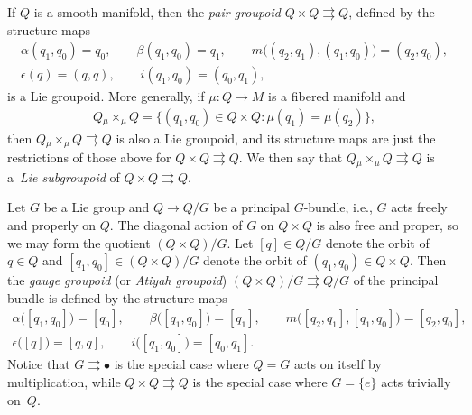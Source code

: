 \documentclass[10pt,a4paper]{amsart}
\numberwithin{equation}{section}
\begin{document}
\begin{Example} \label{ex:pairGroupoid} If $Q$ is a smooth manifold, then the \emph{pair groupoid} $ Q \times Q \rightrightarrows Q $, def\/ined by the structure maps
 \begin{gather*}
 \alpha ( q _1 , q _0 ) = q _0 , \qquad \beta ( q _1 , q _0 ) = q _1 , \qquad m \bigl( ( q _2 , q _1 ) , ( q _1 , q _0 ) \bigr) = ( q _2 , q _0 ) ,\\
 \epsilon (q) = ( q, q ) , \qquad i ( q _1 , q _0 ) = ( q _0, q _1 ) ,
 \end{gather*}
 is a Lie groupoid. More generally, if $ \mu \colon Q \rightarrow M $ is a f\/ibered manifold and
 \begin{gather*}
 Q \mathbin{ _\mu \times _\mu } Q = \bigl\{ ( q _1, q _0 ) \in Q \times Q\colon \mu ( q _1 ) = \mu ( q _2 ) \bigr\},
 \end{gather*}
 then $ Q \mathbin{ _\mu \times _\mu } Q \rightrightarrows Q $ is also a Lie groupoid, and its structure maps are just the restrictions of those above for $ Q \times Q \rightrightarrows Q $. We then say that $ Q \mathbin{ _\mu \times _\mu } Q \rightrightarrows Q $ is a~\emph{Lie subgroupoid} of $ Q \times Q \rightrightarrows Q $.
\end{Example}

\begin{Example} \label{ex:gaugeGroupoid} Let $G$ be a Lie group and $ Q \rightarrow Q / G $ be a principal $G$-bundle, i.e., $G$ acts freely and properly on $Q$. The diagonal action of $G$ on $ Q \times Q $ is also free and proper, so we may form the quotient $ ( Q \times Q ) / G $. Let $ [ q ] \in Q / G $
 denote the orbit of $ q \in Q $ and $ [ q _1 , q _0 ] \in ( Q \times Q ) / G $ denote the orbit of $ ( q _1 , q _0 ) \in Q \times Q $. Then the \emph{gauge groupoid} (or \emph{Atiyah groupoid}) $ ( Q \times Q ) / G \rightrightarrows Q / G $ of the principal bundle is def\/ined by the structure maps
 \begin{gather*}
 \alpha \bigl( [ q _1 , q _0 ] \bigr) = [q _0] , \qquad \beta \bigl( [ q _1, q _0 ] \bigr) = [q _1] , \qquad m \bigl( [q _2 , q
 _1 ] , [ q _1 , q _0 ] \bigr) = [ q _2 , q _0 ] ,\\
 \epsilon \bigl( [q] \bigr) = [ q, q ] , \qquad i \bigl( [ q _1 , q _0] \bigr) = [q _0, q _1].
 \end{gather*}
 Notice that $ G \rightrightarrows \bullet $ is the special case where $ Q = G $ acts on itself by multiplication, while $ Q \times Q \rightrightarrows Q $ is the special case where $ G = \{ e \} $ acts trivially on~$Q$.
\end{Example}
\end{document}
